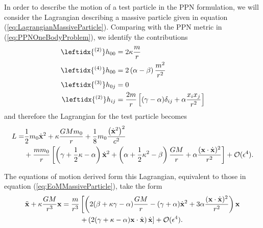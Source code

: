In order to describe the motion of a test particle in the PPN formulation, we will consider the Lagrangian describing a massive particle given in equation (\ref{eq:LagrangianMassiveParticle}). Comparing with the PPN metric in (\ref{eq:PPNOneBodyProblem}), we identify the contributions
\begin{subequations}
\begin{align}
\leftidx{^{(2)}} h_{00} &= 2\kappa \frac{m}{r} \\
\leftidx{^{(4)}} h_{00} &= 2\left( \alpha - \beta  \right) \frac{ m^2}{r^2} \\
\leftidx{^{(3)}} h_{0j} &=0\\
\leftidx{^{(2)}} h_{ij} &=  \frac{2m}{r}  \left[ (\gamma - \alpha ) \delta_{ij} + \alpha \frac{x_i x_j}{r^2} \right]
\end{align}
\end{subequations}
and therefore the Lagrangian for the test particle becomes
\begin{align}
L = & \frac{1}{2} m_0\dot{\textbf{x}}^2 + \kappa \frac{GMm_0}{r} + \frac{1}{8} m_0\frac{\left( \dot{\textbf{x}}^2 \right)^2}{c^2} \notag \\
& +  \frac{m m_0}{r} \left[ \left( \gamma + \frac{1}{2}\kappa - \alpha \right) \dot{\textbf{x}}^2 + \left( \alpha  + \frac{1}{2} \kappa^2 - \beta \right) \frac{GM}{r} + \alpha \frac{(\textbf{x} \cdot \dot{\textbf{x}} )^2}{r^2}  \right] + \mathcal{O} ( \epsilon ^4 ) . \label{eq:PPNLagrangian1}
\end{align}

The equations of motion derived form this Lagrangian,  equivalent to those in equation (\ref{eq:EoMMassiveParticle}),  take the form
\begin{align}
\ddot{\textbf{x}} + \kappa \frac{GM}{r^3} \textbf{x} = \frac{m}{r^3} & \left[  \left( 2(\beta + \kappa \gamma -\alpha ) \frac{GM}{r} - (\gamma + \alpha) \dot{\textbf{x}}^2 + 3\alpha \frac{(\textbf{x} \cdot \dot{\textbf{x}})^2}{r^2} \right) \textbf{x}   \right. \notag \\
& \left. +\left( 2(\gamma +\kappa - \alpha) \textbf{x} \cdot \dot{\textbf{x}} \right) \dot{\textbf{x}} \right] + \mathcal{O} ( \epsilon ^4 ). \label{eq:PPNEoM1}
\end{align}

